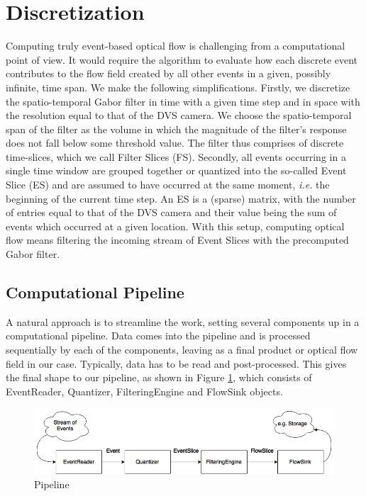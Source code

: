 \section{Discretization}

Computing truly event-based optical flow is challenging from a computational point of view. 
It would require the algorithm to evaluate how each discrete event contributes to the flow field created by all other events in a given, possibly infinite, time span.
We make the following simplifications.
Firstly, we discretize the spatio-temporal Gabor filter in time with a given time step and in space with the resolution equal to that of the DVS camera.
We choose the spatio-temporal span of the filter as the volume in which the magnitude of the filter's response does not fall below some threshold value.
The filter thus comprises of discrete time-slices, which we call Filter Slices (FS).
Secondly, all events occurring in a single time window are grouped together or quantized into the so-called Event Slice (ES) and are assumed to have occurred at the same moment, \emph{i.e.} the beginning of the current time step. 
An ES is a (sparse) matrix, with the number of entries equal to that of the DVS camera and their value being the sum of events which occurred at a given location. 
With this setup, computing optical flow means filtering the incoming stream of Event Slices with the precomputed Gabor filter.


\subsection{Computational Pipeline}
A natural approach is to streamline the work, setting several components up in a computational pipeline.
Data comes into the pipeline and is processed sequentially by each of the components, leaving as a final product or optical flow field in our case. 
Typically, data has to be read and post-processed.
This gives the final shape to our pipeline, as shown in Figure \ref{fig:pipeline}, which consists of EventReader, Quantizer, FilteringEngine and FlowSink objects.

\begin{figure}[ht!]
 \includegraphics[width=\textwidth]{figs/pipeline}
 \caption{Pipeline}
  \label{fig:pipeline}
\end{figure}

